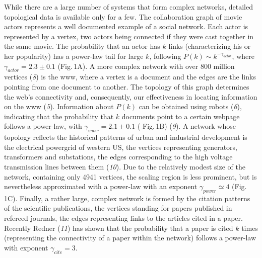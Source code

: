 While there are a large number of systems that form complex networks,   detailed topological data is available only for a few. The collaboration graph of movie actors represents a well documented example of a social network. Each actor is represented by a vertex, two actors being connected if they were cast together in the same movie. The probability that an actor has $k$ links (characterizing his or her popularity) has a power-law tail for large $k$, following $P(k) \sim k^{-\gamma_{actor}}$, where $\gamma_{actor}=2.3\pm 0.1$ (Fig.$\,$1A). A more complex network with over $800$ million vertices  ({\it 8}) is the  www,  where a vertex is a document and the edges are the links pointing from one document to another. The topology of this graph determines the web's connectivity and, consequently, our effectiveness in locating information on the www ({\it 5}). Information about $P(k)$  can be obtained using robots ({\it 6}), indicating that the probability that $k$ documents point to a certain webpage follows a power-law,  with $\gamma_{www}=2.1\pm 0.1$ ( Fig.$\,$1B) ({\it 9}). A network whose topology reflects the historical patterns of urban and industrial development is the electrical powergrid of western US, the  vertices representing generators, transformers and substations, the edges  corresponding to the high voltage transmission lines between them ({\it 10}). Due to the relatively modest size of the network, containing only 4941 vertices, the scaling region is less prominent, but is nevertheless approximated with a power-law with an exponent $\gamma_{power}\simeq 4$ (Fig.$\,$1C). Finally, a rather large, complex network is formed by the citation patterns of the scientific publications, the vertices standing for papers published in refereed journals, the edges representing links to the articles cited in a paper. Recently Redner ({\it 11}) has shown that the probability that a paper is cited $k$ times (representing the connectivity of a paper within the network) follows a power-law with exponent $\gamma_{cite}=3$. 


